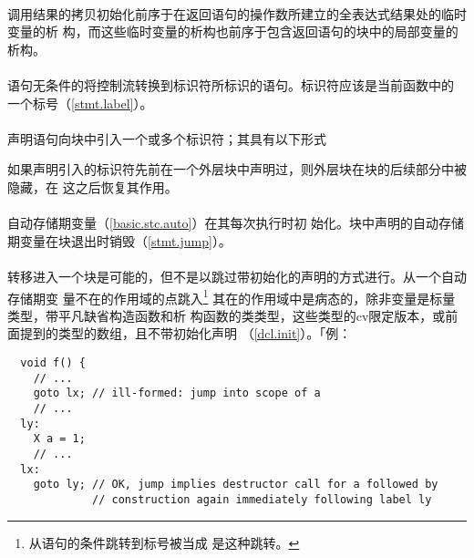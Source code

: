 \paragraph{}
调用结果的拷贝初始化前序于在返回语句的操作数所建立的全表达式结果处的临时变量的析
构，而这些临时变量的析构也前序于包含返回语句的块中的局部变量的析构。

\paragraph{}
语句无条件的将控制流转换到标识符所标识的语句。标识符应该是当前函数中的
一个标号（\ref{stmt.label}）。

\paragraph{}
声明语句向块中引入一个或多个标识符；其具有以下形式


如果声明引入的标识符先前在一个外层块中声明过，则外层块在块的后续部分中被隐藏，在
这之后恢复其作用。

\paragraph{}
自动存储期变量（\ref{basic.stc.auto}）在其每次执行时初
始化。块中声明的自动存储期变量在块退出时销毁（\ref{stmt.jump}）。

\paragraph{}
转移进入一个块是可能的，但不是以跳过带初始化的声明的方式进行。从一个自动存储期变
量不在的作用域的点跳入\footnote{从语句的条件跳转到标号被当成
是这种跳转。} 其在的作用域中是病态的，除非变量是标量类型，带平凡缺省构造函数和析
构函数的类类型，这些类型的cv限定版本，或前面提到的类型的数组，且不带初始化声明
（\ref{dcl.init}）。「例：
\begin{lstlisting}
  void f() {
    // ...
    goto lx; // ill-formed: jump into scope of a
    // ...
  ly:
    X a = 1;
    // ...
  lx:
    goto ly; // OK, jump implies destructor call for a followed by
             // construction again immediately following label ly
\end{lstlisting}

